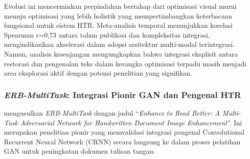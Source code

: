 \documentclass[12pt,a4paper]{article}
\begin{document}
Evolusi ini mencerminkan perpindahan bertahap dari optimisasi visual murni menuju optimisasi yang lebih holistik yang mempertimbangkan keterbacaan fungsional untuk sistem HTR. Meta-analisis temporal menunjukkan korelasi Spearman r=0,73 antara tahun publikasi dan kompleksitas integrasi, mengindikasikan akselerasi dalam adopsi arsitektur multi-modal terintegrasi. Namun, analisis kesenjangan mengungkapkan bahwa integrasi eksplisit antara restorasi dan pengenalan teks dalam kerangka optimisasi terpadu masih menjadi area eksplorasi aktif dengan potensi penelitian yang signifikan.


\subsubsection{\textit{ERB-MultiTask}: Integrasi Pionir GAN dan Pengenal HTR}
\label{subsubsec:erb-multitask}


\textcite{erb2021} mengusulkan \textit{ERB-MultiTask} dengan judul ``\textit{Enhance to Read Better: A Multi-Task Adversarial Network for Handwritten Document Image Enhancement}''. Ini merupakan penelitian pionir yang memvalidasi integrasi pengenal Convolutional Recurrent Neural Network (CRNN) secara langsung ke dalam proses pelatihan GAN untuk peningkatan dokumen tulisan tangan.
\end{document}

